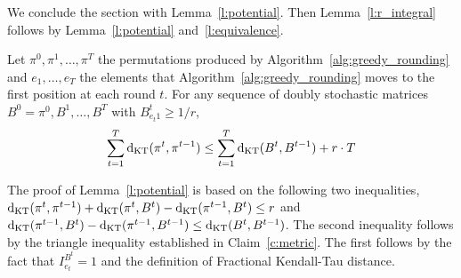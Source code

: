\noindent We conclude the section with Lemma~\ref{l:potential}.
Then Lemma~\ref{l:r_integral} follows by Lemma~\ref{l:potential} 
and~\ref{l:equivalence}.%
\begin{lemma}\label{l:potential}
Let $\pi^0,\pi^1,\ldots,\pi^T$ the permutations produced by Algorithm~\ref{alg:greedy_rounding} and $e_1,\ldots,e_T$ the elements that Algorithm~\ref{alg:greedy_rounding} moves to the first position at each round $t$. For any sequence of doubly stochastic matrices $B^0 = \pi^0,B^1,\ldots,B^T$ with $B_{e_t 1}^t \geq 1/r$,
$$\sum_{t=1}^T \mathrm{d}_{\mathrm{KT}}(\pi^t,\pi^{t-1}) \leq \sum_{t=1}^T \mathrm{d}_{\mathrm{KT}}(B^t,B^{t-1}) + r \cdot T
$$
\end{lemma}
The proof of Lemma~\ref{l:potential} is based on the following two inequalities, $\mathrm{d}_{\mathrm{KT}}(\pi^t,\pi^{t-1}) + \mathrm{d}_{\mathrm{KT}}(\pi^t,B^t) - \mathrm{d}_{\mathrm{KT}}(\pi^{t-1},B^t) \leq r$ and $\mathrm{d}_{\mathrm{KT}}(\pi^{t-1},B^t) - \mathrm{d}_{\mathrm{KT}}(\pi^{t-1},B^{t-1}) \leq \mathrm{d}_{\mathrm{KT}}(B^t,B^{t-1})$. The second inequality follows by the triangle inequality established in Claim~\ref{c:metric}. The first follows by the fact that $I_{e_t}^{B^t} = 1$ and the definition of Fractional Kendall-Tau distance.

